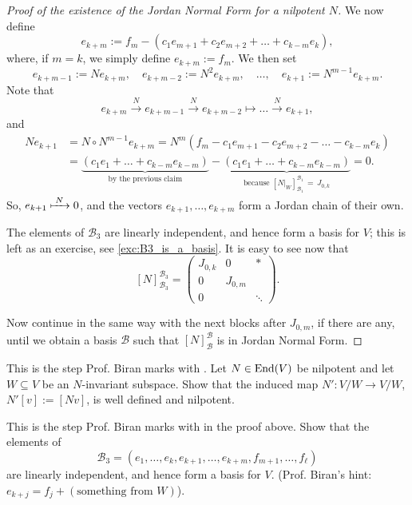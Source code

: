 \begin{proof}[Proof of the existence of the Jordan Normal Form for a nilpotent $N$]
We now define
\[
    e_{k+m} := f_m - \left(c_1 e_{m+1} + c_2 e_{m+2} + \dots + c_{k-m} e_k\right),
\]
where, if $m = k$, we simply define $e_{k+m} := f_m$. We then set
\[
    e_{k+m-1} := N e_{k+m}, \quad e_{k+m-2} := N^2 e_{k+m}, \quad \dots, \quad e_{k+1} := N^{m-1} e_{k+m}.
\]
Note that
\[
    e_{k+m} \xrightarrow{\;N\;} e_{k+m-1} \xrightarrow{\;N\;} e_{k+m-2} \longmapsto \dots \xrightarrow{\;N\;} e_{k+1},
\]
and
\begin{align*}
    N e_{k+1} &= N \circ N^{m-1} e_{k+m} = N^m\left(f_m - c_1 e_{m+1} - c_2 e_{m+2} - \dots - c_{k-m} e_k\right) \\
    &= \underbrace{\left(c_1 e_1 + \dots + c_{k-m} e_{k-m}\right)}_{\text{by the previous claim}} - \underbrace{\left(c_1 e_1 + \dots + c_{k-m} e_{k-m}\right)}_{\text{because } [N|_W]_{\mathcal{B}_1}^{\mathcal{B}_1} \, = \, J_{0,k}} = 0.
\end{align*}
So, $e_{k+1} \xmapsto{\;N\;} 0$, and the vectors $e_{k+1}, \dots, e_{k+m}$ form a Jordan chain of their own.

The elements of $\mathcal{B}_3$ are linearly independent, and hence form a basis for $V$; this is left as an exercise, see \cref{exc:B3_is_a_basis}. It is easy to see now that
\[
    [N]_{\mathcal{B}_3}^{\mathcal{B}_3} = \left(\begin{array}{c|c|c} J_{0,k} & 0 & * \\ \hline 0 & J_{0,m} & \\ 0 & & \ddots \end{array}\right).
\]

Now continue in the same way with the next blocks after $J_{0,m}$, if there are any, until we obtain a basis $\mathcal{B}$ such that $[N]_{\mathcal{B}}^{\mathcal{B}}$ is in Jordan Normal Form.
\end{proof}

\begin{exercise}
\label{exc:induced_map_nilpotent}
This is the step Prof. Biran marks with . Let $N \in \operatorname{End}(V)$ be nilpotent and let $W \subseteq V$ be an $N$-invariant subspace. Show that the induced map $N' \colon V/W \to V/W$, $N'[v] := [Nv]$, is well defined and nilpotent.
\end{exercise}

\begin{exercise}
\label{exc:B3_is_a_basis}
This is the step Prof. Biran marks with  in the proof above. Show that the elements of
\[
    \mathcal{B}_3 = (e_1, \dots, e_k, e_{k+1}, \dots, e_{k+m}, f_{m+1}, \dots, f_\ell)
\]
are linearly independent, and hence form a basis for $V$. (Prof. Biran's hint: $e_{k+j} = f_j + (\text{something from } W)$).
\end{exercise}

